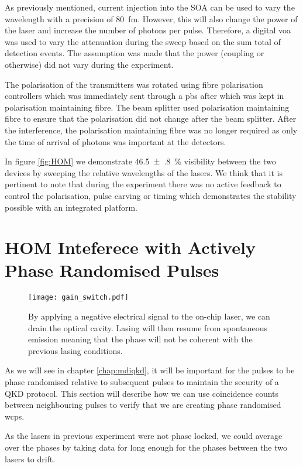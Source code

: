 As previously mentioned, current injection into the \ac{SOA} can be used to vary the wavelength with a precision of \SI{80}{\femto\metre}. However, this will also change the power of the laser and increase the number of photons per pulse. Therefore, a digital \ac{voa} was used to vary the attenuation during the sweep based on the sum total of detection events. The assumption was made that the power (coupling or otherwise) did not vary during the experiment. 

The polarisation of the transmitters was rotated using fibre polarisation controllers which was immediately sent through a \ac{pbs} after which was kept in polarisation maintaining fibre. The beam splitter used polarisation maintaining fibre to ensure that the polarisation did not change after the beam splitter. After the interference, the polarisation maintaining fibre was no longer required as only the time of arrival of photons was important at the detectors.

In figure \ref{fig:HOM} we demonstrate \SI{46.5(8)}{\percent} visibility between the two devices by sweeping the relative wavelengths of the lasers. We think that it is pertinent to note that during the experiment there was no active feedback to control the polarisation, pulse carving or timing which demonstrates the stability possible with an integrated platform. 

\section{HOM Inteferece with Actively Phase Randomised Pulses}

\begin{figure}[tbp]
	\centering
	\texttt{[image: gain\_switch.pdf]}
	\caption[Gain switching of the on-chip lasers at \SI{250}{MHz}]{By applying a negative electrical signal to the on-chip laser, we can drain the optical cavity. Lasing will then resume from spontaneous emission meaning that the phase will not be coherent with the previous lasing conditions.}
	\label{fig:gain_switch}
\end{figure}

As we will see in chapter \ref{chap:mdiqkd}, it will be important for the pulses to be phase randomised relative to subsequent pulses to maintain the security of a \ac{QKD} protocol. This section will describe how we can use coincidence counts between neighbouring pulses to verify that we are creating phase randomised \acp{wcp}.

As the lasers in previous experiment were not phase locked, we could average over the phases by taking data for long enough for the phases between the two lasers to drift.

